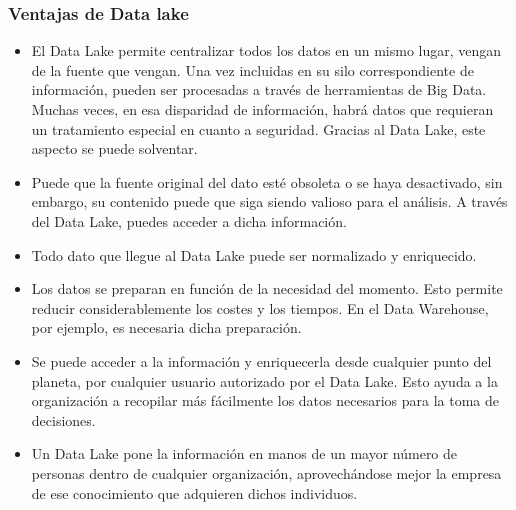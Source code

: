 \documentclass[twoside,twocolumn]{article}
\begin{document}
\subsubsection{Ventajas de Data lake}
\begin{itemize}
    \item El Data Lake permite centralizar todos los datos en un mismo lugar, vengan de la fuente que vengan. Una vez incluidas en su silo correspondiente de información, pueden ser procesadas a través de herramientas de Big Data. Muchas veces, en esa disparidad de información, habrá datos que requieran un tratamiento especial en cuanto a seguridad. Gracias al Data Lake, este aspecto se puede solventar.
    \item  Puede que la fuente original del dato esté obsoleta o se haya desactivado, sin embargo, su contenido puede que siga siendo valioso para el análisis. A través del Data Lake, puedes acceder a dicha información.
    \item  Todo dato que llegue al Data Lake puede ser normalizado y enriquecido.
    \item  Los datos se preparan en función de la necesidad del momento. Esto permite reducir considerablemente los costes y los tiempos. En el Data Warehouse, por ejemplo, es necesaria dicha preparación.
    \item  Se puede acceder a la información y enriquecerla desde cualquier punto del planeta, por cualquier usuario autorizado por el Data Lake. Esto ayuda a la organización a recopilar más fácilmente los datos necesarios para la toma de decisiones.
    \item  Un Data Lake pone la información en manos de un mayor número de personas dentro de cualquier organización, aprovechándose mejor la empresa de ese conocimiento que adquieren dichos individuos.
\end{itemize}
\end{document}
